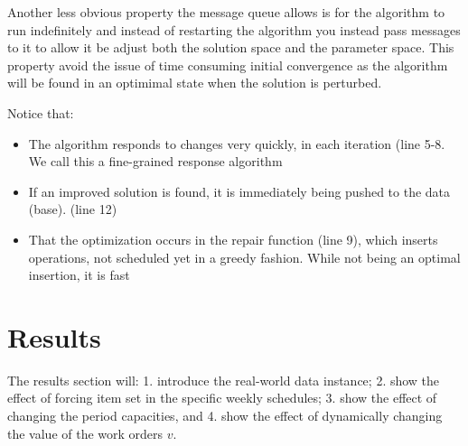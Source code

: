 \documentclass[preprint,12pt,authoryear]{elsarticle}
\begin{document}
Another less obvious property the message queue allows is for the algorithm to run indefinitely and instead of restarting the algorithm you instead pass 
messages to it to allow it be adjust both the solution space and the parameter space.
This property avoid the issue of time consuming initial convergence as the algorithm will be found in an optimimal state when the solution is perturbed.

Notice that:

\begin{itemize}
    \item The algorithm responds to changes very quickly, in each iteration (line 5-8. We call this a fine-grained response algorithm
    \item If an improved solution is found, it is immediately being pushed to the data (base). (line 12)
    \item That the optimization occurs in the repair function (line 9), which inserts operations, not scheduled yet in a greedy fashion. While not being an optimal insertion, it is fast
\end{itemize}

\section{Results}
\label{sec:3-results}
The results section will: 1. introduce the real-world data instance; 2. show the effect of forcing item set in the specific weekly schedules; 3. show the effect of changing the 
period capacities, and 4. show the effect of dynamically changing the value of the work orders $v$. 
\end{document}
